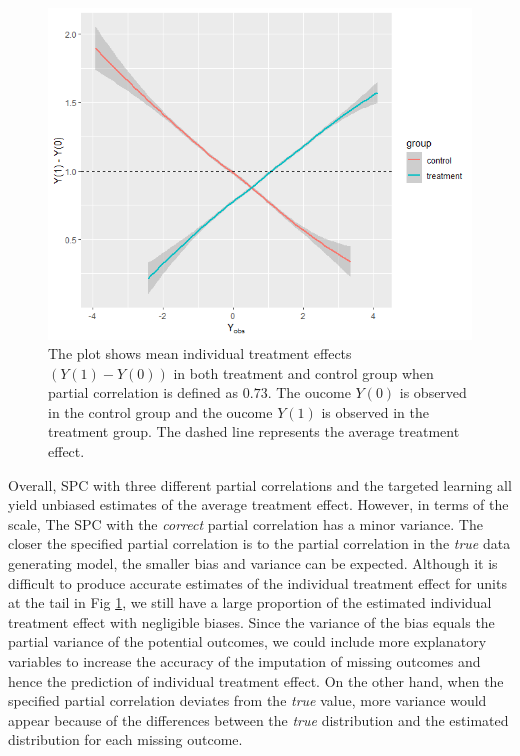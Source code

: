 \begin{figure}[ht!]
	\centering
	\includegraphics[width=1.0\linewidth,height=0.5\textheight]{plots/plot4.5} 
	\caption{The plot shows mean individual treatment effects $(Y(1) - Y(0))$ in both treatment and control group when partial correlation is defined as $0.73$. The oucome $Y(0)$ is observed in the control group and the oucome $Y(1)$ is observed in the treatment group. The dashed line represents the average treatment effect.}
	\label{fig4_3}
\end{figure}
	Overall, SPC with three different partial correlations and the targeted learning all yield unbiased estimates of the average treatment effect. However, in terms of the scale, The SPC with the \emph{correct} partial correlation has a minor variance. The closer the specified partial correlation is to the partial correlation in the \emph{true} data generating model, the smaller bias and variance can be expected. Although it is difficult to produce accurate estimates of the individual treatment effect for units at the tail in Fig \ref{fig4_3}, we still have a large proportion of the estimated individual treatment effect with negligible biases. Since the variance of the bias equals the partial variance of the potential outcomes, we could include more explanatory variables to increase the accuracy of the imputation of missing outcomes and hence the prediction of individual treatment effect. On the other hand, when the specified partial correlation deviates from the \emph{true} value, more variance would appear because of the differences between the \emph{true} distribution and the estimated distribution for each missing outcome. 
	

